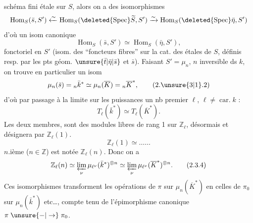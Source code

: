 schéma fini étale sur \(S\), alors on a des isomorphismes
\[
\operatorname{Hom}_{S}(\bar s,S')\xleftarrow{\sim}\operatorname{Hom}_S(\deleted{\operatorname{Spec}}\widetilde S,S')\xrightarrow{\sim}\operatorname{Hom}_S(\deleted{\operatorname{Spec}}\bar\eta,S')
\]
d'où un isom canonique
\[
\operatorname{Hom}_S(\bar s,S')\simeq\operatorname{Hom}_S(\bar\eta,S'),\tag*{(2.3.1)}
\]
fonctoriel en \(S'\) (isom. des  ``foncteurs fibres'' sur la cat. des  étales de \(S\), définis resp. par les pts géom. \(\unsure{\bar t|\bar\eta|\bar s}\) et \(\bar s\)). Faisant \(S'=\mu_n\), \(n\)  inversible ds \(k\), on trouve en particulier un isom
\[
\mu_n(\bar s)={}_n\bar k^*\simeq\mu_n(\overline K)={}_n\overline K^*,\tag*{(2.\unsure{3|1}.2)}
\]
d'où par passage à la limite sur les puissances un nb premier \(\ell\), \(\ell\ne\operatorname{car.}k\) :
\[
T_\ell(\bar k^*)\simeq T_\ell(\overline K^*).\tag*{(2.3.3)}
\]
 Les deux membres,  sont des modules libres de rang 1 sur \(\mathbb Z_\ell\),   désormais et désignera par \(\mathbb Z_\ell(1)\). 
\[
\mathbb Z_\ell(1)\simeq\ldots\ldots\tag*{(2.3.3)}
\]
  \(n\).ième (\(n\in\mathbb Z\)) est notée \(\mathbb Z_\ell(n)\). Donc on a
\[
\mathbb Z_\ell(n)\simeq\varprojlim_\nu\mu_{\ell^\nu}(\bar k^*)^{\otimes n}\simeq\varprojlim_\nu\mu_{\ell^\nu}(\overline K^*)^{\otimes n}.\tag*{(2.3.4)}
\]
Ces isomorphismes  transforment les opérations de \(\pi\) sur \(\mu_n(\overline K^*)\)  en celles de \(\pi_0\) sur \(\mu_n(\bar k^*)\) etc\ldots, compte tenu de l'épimorphisme canonique \(\pi\mathrel{\unsure{-|\to}}\pi_0\).
